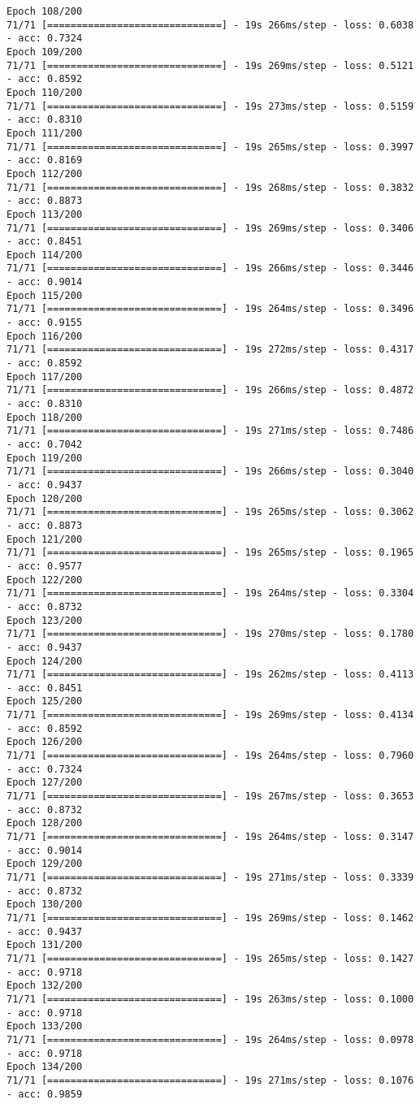 \documentclass[11pt]{article}
\begin{document}
\begin{Verbatim}[commandchars=\\\{\}]
Epoch 108/200
71/71 [==============================] - 19s 266ms/step - loss: 0.6038 - acc: 0.7324
Epoch 109/200
71/71 [==============================] - 19s 269ms/step - loss: 0.5121 - acc: 0.8592
Epoch 110/200
71/71 [==============================] - 19s 273ms/step - loss: 0.5159 - acc: 0.8310
Epoch 111/200
71/71 [==============================] - 19s 265ms/step - loss: 0.3997 - acc: 0.8169
Epoch 112/200
71/71 [==============================] - 19s 268ms/step - loss: 0.3832 - acc: 0.8873
Epoch 113/200
71/71 [==============================] - 19s 269ms/step - loss: 0.3406 - acc: 0.8451
Epoch 114/200
71/71 [==============================] - 19s 266ms/step - loss: 0.3446 - acc: 0.9014
Epoch 115/200
71/71 [==============================] - 19s 264ms/step - loss: 0.3496 - acc: 0.9155
Epoch 116/200
71/71 [==============================] - 19s 272ms/step - loss: 0.4317 - acc: 0.8592
Epoch 117/200
71/71 [==============================] - 19s 266ms/step - loss: 0.4872 - acc: 0.8310
Epoch 118/200
71/71 [==============================] - 19s 271ms/step - loss: 0.7486 - acc: 0.7042
Epoch 119/200
71/71 [==============================] - 19s 266ms/step - loss: 0.3040 - acc: 0.9437
Epoch 120/200
71/71 [==============================] - 19s 265ms/step - loss: 0.3062 - acc: 0.8873
Epoch 121/200
71/71 [==============================] - 19s 265ms/step - loss: 0.1965 - acc: 0.9577
Epoch 122/200
71/71 [==============================] - 19s 264ms/step - loss: 0.3304 - acc: 0.8732
Epoch 123/200
71/71 [==============================] - 19s 270ms/step - loss: 0.1780 - acc: 0.9437
Epoch 124/200
71/71 [==============================] - 19s 262ms/step - loss: 0.4113 - acc: 0.8451
Epoch 125/200
71/71 [==============================] - 19s 269ms/step - loss: 0.4134 - acc: 0.8592
Epoch 126/200
71/71 [==============================] - 19s 264ms/step - loss: 0.7960 - acc: 0.7324
Epoch 127/200
71/71 [==============================] - 19s 267ms/step - loss: 0.3653 - acc: 0.8732
Epoch 128/200
71/71 [==============================] - 19s 264ms/step - loss: 0.3147 - acc: 0.9014
Epoch 129/200
71/71 [==============================] - 19s 271ms/step - loss: 0.3339 - acc: 0.8732
Epoch 130/200
71/71 [==============================] - 19s 269ms/step - loss: 0.1462 - acc: 0.9437
Epoch 131/200
71/71 [==============================] - 19s 265ms/step - loss: 0.1427 - acc: 0.9718
Epoch 132/200
71/71 [==============================] - 19s 263ms/step - loss: 0.1000 - acc: 0.9718
Epoch 133/200
71/71 [==============================] - 19s 264ms/step - loss: 0.0978 - acc: 0.9718
Epoch 134/200
71/71 [==============================] - 19s 271ms/step - loss: 0.1076 - acc: 0.9859

\end{Verbatim}
\end{document}
